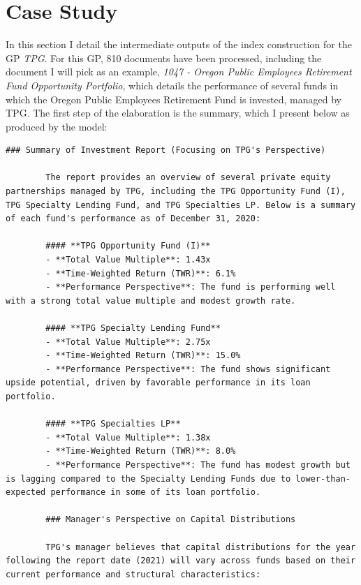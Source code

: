 
\section{Case Study}\label{sec:case-studies}
    In this section I detail the intermediate outputs of the index construction for the GP \textit{TPG}.
    For this GP, 810 documents have been processed, including the document I will pick as an example, \textit{1047 - Oregon Public Employees Retirement Fund Opportunity Portfolio}, which details the performance of several funds in which the Oregon Public Employees Retirement Fund is invested, managed by TPG\@.
    The first step of the elaboration is the summary, which I present below as produced by the model:

    \begin{lstlisting}[style=cmd, label={lst:oregon_summary}]
        ### Summary of Investment Report (Focusing on TPG's Perspective)

        The report provides an overview of several private equity partnerships managed by TPG, including the TPG Opportunity Fund (I), TPG Specialty Lending Fund, and TPG Specialties LP. Below is a summary of each fund's performance as of December 31, 2020:

        #### **TPG Opportunity Fund (I)**
        - **Total Value Multiple**: 1.43x
        - **Time-Weighted Return (TWR)**: 6.1%
        - **Performance Perspective**: The fund is performing well with a strong total value multiple and modest growth rate.

        #### **TPG Specialty Lending Fund**
        - **Total Value Multiple**: 2.75x
        - **Time-Weighted Return (TWR)**: 15.0%
        - **Performance Perspective**: The fund shows significant upside potential, driven by favorable performance in its loan portfolio.

        #### **TPG Specialties LP**
        - **Total Value Multiple**: 1.38x
        - **Time-Weighted Return (TWR)**: 8.0%
        - **Performance Perspective**: The fund has modest growth but is lagging compared to the Specialty Lending Funds due to lower-than-expected performance in some of its loan portfolio.

        ### Manager's Perspective on Capital Distributions

        TPG's manager believes that capital distributions for the year following the report date (2021) will vary across funds based on their current performance and structural characteristics:


\end{lstlisting}

